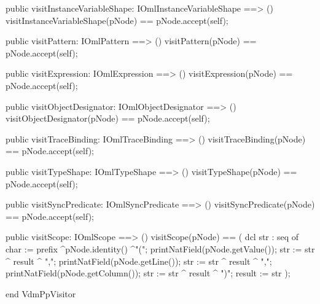 \begin{vdm_al}
  public visitInstanceVariableShape: IOmlInstanceVariableShape ==> ()
  visitInstanceVariableShape(pNode) == pNode.accept(self);

  public visitPattern: IOmlPattern ==> ()
  visitPattern(pNode) == pNode.accept(self);

  public visitExpression: IOmlExpression ==> ()
  visitExpression(pNode) == pNode.accept(self);

  public visitObjectDesignator: IOmlObjectDesignator ==> ()
  visitObjectDesignator(pNode) == pNode.accept(self);

  public visitTraceBinding: IOmlTraceBinding ==> ()
  visitTraceBinding(pNode) == pNode.accept(self);

  public visitTypeShape: IOmlTypeShape ==> ()
  visitTypeShape(pNode) == pNode.accept(self);

  public visitSyncPredicate: IOmlSyncPredicate ==> ()
  visitSyncPredicate(pNode) == pNode.accept(self);

  public visitScope: IOmlScope ==> ()
  visitScope(pNode) == 
    ( dcl str : seq of char := prefix ^pNode.identity() ^"(";
      printNatField(pNode.getValue());
      str := str ^ result ^ ",";
      printNatField(pNode.getLine());
      str := str ^ result ^ ",";
      printNatField(pNode.getColumn());
      str := str ^ result ^ ")";
      result := str );

end VdmPpVisitor
\end{vdm_al}
